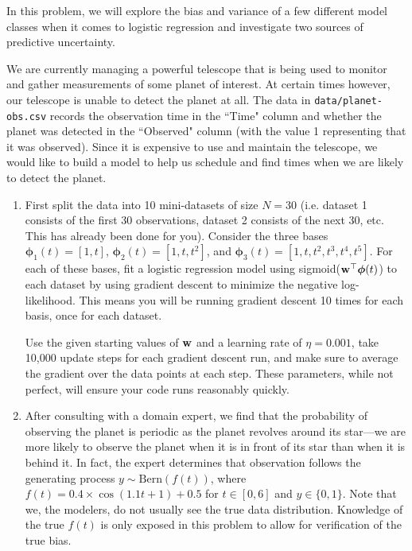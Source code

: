 \documentclass[submit]{harvardml}
\begin{document}
\begin{problem}
In this problem, we will explore the bias and variance of a few different model classes when it comes to logistic regression and investigate two sources of predictive uncertainty.

We are currently managing a powerful telescope that is being used to monitor and gather measurements of some planet of interest. At certain times however, our telescope is unable to detect the planet at all. The data in \verb|data/planet-obs.csv| records the observation time in the ``Time" column and whether the planet was detected in the ``Observed" column (with the value 1 representing that it was observed). Since it is expensive to use and maintain the telescope, we would like to build a model to help us schedule and find times when we are likely to detect the planet.

\begin{enumerate}

\item First split the data into 10 mini-datasets of size $N = 30$ (i.e. dataset 1 consists of the first 30 observations, dataset 2 consists of the next 30, etc. This has already been done for you). Consider the three bases $\boldsymbol\phi_1(t) = [1, t]$, $\boldsymbol\phi_2(t) = [1,
  t, t^2]$, and $\boldsymbol\phi_3(t) = [1, t, t^2, t^3, t^4, t^5]$. For each of these bases, fit a logistic regression model using sigmoid($\mathbf{w}^\top \boldsymbol\phi(t)$) to each dataset by using gradient descent to
  minimize the negative log-likelihood.  This means you will be
  running gradient descent 10 times for each basis, once for each
  dataset.
  
  Use the given starting values of $\mathbf{w}$ and a learning rate of $\eta=0.001$, take 10,000 update
  steps for each gradient descent run, and make sure to average the
  gradient over the data points at each step. These parameters,
  while not perfect, will ensure your code runs reasonably quickly. 

\item After consulting with a domain expert, we find that the probability of observing the planet is periodic as the planet revolves around its star---we are more likely to observe the planet when it is in front of its star than when it is behind it. In fact, the expert determines that observation follows the generating process $y \sim \text{Bern}(f(t))$, where $f(t) = 0.4 \times \cos(1.1t + 1) + 0.5$ for $t \in [0, 6]$ and $y \in \{0,1\}$. Note that we, the modelers, do not usually see the true data distribution. Knowledge of the true $f(t)$ is only exposed in this problem to allow for verification of the true bias.


\end{enumerate}
\end{problem}
\end{document}
